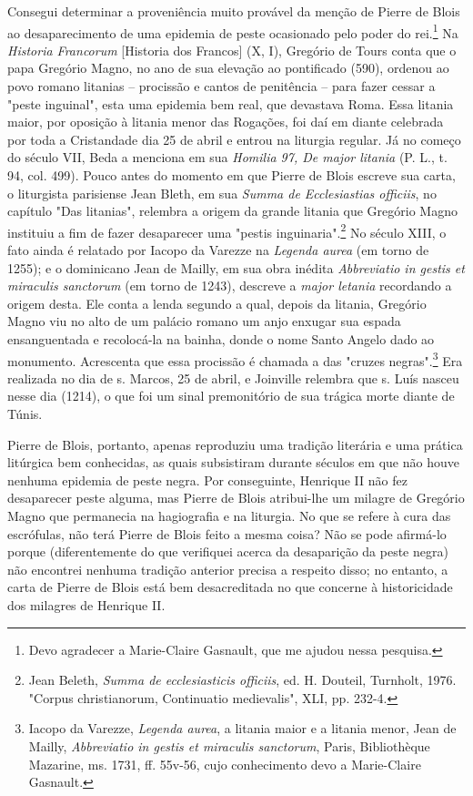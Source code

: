 \documentclass[a5paper]{book}
\begin{document}
Consegui determinar a proveniência muito provável da menção de Pierre de Blois ao desaparecimento de uma epidemia de peste ocasionado pelo poder do rei.\footnote{Devo agradecer a Marie-Claire Gasnault, que me ajudou nessa pesquisa.} Na \textit{Historia Francorum} [Historia dos Francos] (X, I), Gregório de Tours conta que o papa Gregório Magno, no ano de sua elevação ao pontificado (590), ordenou ao povo romano litanias -- procissão e cantos de penitência -- para fazer cessar a "peste inguinal", esta uma epidemia bem real, que devastava Roma. Essa litania maior, por oposição à litania menor das Rogações, foi daí em diante celebrada por toda a Cristandade dia 25 de abril e entrou na liturgia regular. Já no começo do século VII, Beda a menciona em sua \textit{Homilia 97, De major litania} (P. L., t. 94, col. 499). Pouco antes do momento em que Pierre de Blois escreve sua carta, o liturgista parisiense Jean Bleth, em sua \textit{Summa de Ecclesiastias officiis}, no capítulo "Das litanias", relembra a origem da grande litania que Gregório Magno instituiu a fim de fazer desaparecer uma "pestis inguinaria".\footnote{Jean Beleth, \textit{Summa de ecclesiasticis officiis}, ed. H. Douteil, Turnholt, 1976. "Corpus christianorum, Continuatio medievalis", XLI, pp. 232-4.} No século XIII, o fato ainda é relatado por Iacopo da Varezze na \textit{Legenda aurea} (em torno de 1255); e o dominicano Jean de Mailly, em sua obra inédita \textit{Abbreviatio in gestis et miraculis sanctorum} (em torno de 1243), descreve a \textit{major letania} recordando a origem desta. Ele conta a lenda segundo a qual, depois da litania, Gregório Magno viu no alto de um palácio romano um anjo enxugar sua espada ensanguentada e recolocá-la na bainha, donde o nome Santo Angelo dado ao monumento. Acrescenta que essa procissão é chamada a das "cruzes negras".\footnote{Iacopo da Varezze, \textit{Legenda aurea}, a litania maior e a litania menor, Jean de Mailly, \textit{Abbreviatio in gestis et miraculis sanctorum}, Paris, Bibliothèque Mazarine, ms. 1731, ff. 55v-56, cujo conhecimento devo a Marie-Claire Gasnault.} Era realizada no dia de s. Marcos, 25 de abril, e Joinville relembra que s. Luís nasceu nesse dia (1214), o que foi um sinal premonitório de sua trágica morte diante de Túnis.

Pierre de Blois, portanto, apenas reproduziu uma tradição literária e uma prática litúrgica bem conhecidas, as quais subsistiram durante séculos em que não houve nenhuma epidemia de peste negra. Por conseguinte, Henrique II não fez desaparecer peste alguma, mas Pierre de Blois atribui-lhe um milagre de Gregório Magno que permanecia na hagiografia e na liturgia. No que se refere à cura das escrófulas, não terá Pierre de Blois feito a mesma coisa? Não se pode afirmá-lo porque (diferentemente do que verifiquei acerca da desaparição da peste negra) não encontrei nenhuma tradição anterior precisa a respeito disso; no entanto, a carta de Pierre de Blois está bem desacreditada no que concerne à historicidade dos milagres de Henrique II.
\end{document}
